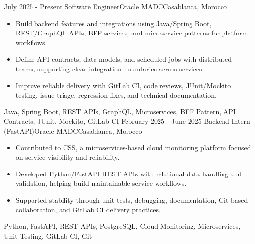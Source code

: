 
\begin{experiences}
  \experience
    {July 2025 - Present}
    {Software Engineer}{Oracle MADC}{Casablanca, Morocco}
    {} {
      \begin{itemize}
        \item Build backend features and integrations using Java/Spring Boot, REST/GraphQL APIs, BFF services, and microservice patterns for platform workflows.
        \item Define API contracts, data models, and scheduled jobs with distributed teams, supporting clear integration boundaries across services.
        \item Improve reliable delivery with GitLab CI, code reviews, JUnit/Mockito testing, issue triage, regression fixes, and technical documentation.
      \end{itemize}
    }
    {Java, Spring Boot, REST APIs, GraphQL, Microservices, BFF Pattern, API Contracts, JUnit, Mockito, GitLab CI}
  \experience
    {February 2025 - June 2025}
    {Backend Intern (FastAPI)}{Oracle MADC}{Casablanca, Morocco}
    {} {
      \begin{itemize}
        \item Contributed to CSS, a microservices-based cloud monitoring platform focused on service visibility and reliability.
        \item Developed Python/FastAPI REST APIs with relational data handling and validation, helping build maintainable service workflows.
        \item Supported stability through unit tests, debugging, documentation, Git-based collaboration, and GitLab CI delivery practices.
      \end{itemize}
    }
    {Python, FastAPI, REST APIs, PostgreSQL, Cloud Monitoring, Microservices, Unit Testing, GitLab CI, Git}
  \emptySeparator
\end{experiences}
